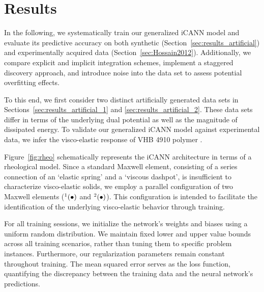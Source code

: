 \section{Results}
\label{sec:results}
%
In the following, we systematically train our generalized iCANN model and evaluate its predictive accuracy on both synthetic (Section~\ref{sec:results_artificial}) and experimentally acquired data (Section~\ref{sec:Hossain2012}). Additionally, we compare explicit and implicit integration schemes, implement a staggered discovery approach, and introduce noise into the data set to assess potential overfitting effects.

To this end, we first consider two distinct artificially generated data sets in Sections~\ref{sec:results_artificial_1} and \ref{sec:results_artificial_2}. These data sets differ in terms of the underlying dual potential as well as the magnitude of dissipated energy. To validate our generalized iCANN model against experimental data, we infer the visco-elastic response of VHB 4910 polymer \cite{hossain2012}.

Figure~\ref{fig:rheo} schematically represents the iCANN architecture in terms of a rheological model. 
Since a standard Maxwell element, consisting of a series connection of an `elastic spring' and a `viscous dashpot', is insufficient to characterize visco-elastic solids, we employ a parallel configuration of two Maxwell elements ($\prescript{1}{}{}(\bullet)$ and $ \prescript{2}{}{}(\bullet)$). 
This configuration is intended to facilitate the identification of the underlying visco-elastic behavior through training.

For all training sessions, we initialize the network's weights and biases using a uniform random distribution. 
We maintain fixed lower and upper value bounds across all training scenarios, rather than tuning them to specific problem instances. 
Furthermore, our regularization parameters remain constant throughout training. 
The mean squared error serves as the loss function, quantifying the discrepancy between the training data and the neural network’s predictions.

